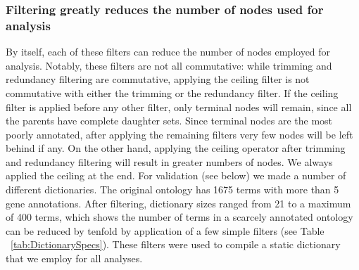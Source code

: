 \documentclass[linenumbers, doublespacing]{bmcart}
\begin{document}
\subsubsection*{Filtering greatly reduces the number of nodes used for analysis}
	By itself, each of these filters can reduce the number of nodes employed for analysis. Notably, these filters are not all commutative: while trimming and redundancy filtering are commutative, applying the ceiling filter is not commutative with either the trimming or the redundancy filter. If the ceiling filter is  applied before any other filter, only terminal nodes will remain, since all the parents have complete daughter sets. Since terminal nodes are the most poorly annotated, after applying the remaining filters very few nodes will be left behind if any. On the other hand, applying the ceiling operator after trimming and redundancy filtering  will result in greater numbers of nodes. We always applied the ceiling at the end. For validation (see below) we made a number of different dictionaries. The original ontology has 1675 terms with more than 5 gene annotations. After filtering, dictionary sizes ranged from 21 to a maximum of 400 terms, which shows the number of terms in a scarcely annotated ontology can be reduced by tenfold by application of a few simple filters (see Table ~\ref{tab:DictionarySpecs}). These filters were used to compile a static dictionary that we employ for all analyses.
\end{document}
